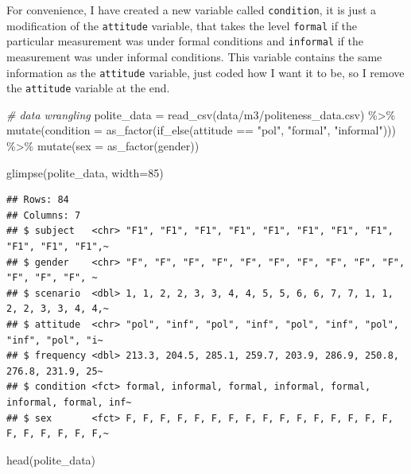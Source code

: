 \documentclass[
  openany]{book}
\newenvironment{Shaded}{\begin{snugshade}}{\end{snugshade}}
\newcommand{\AttributeTok}[1]{\textcolor[rgb]{0.77,0.63,0.00}{#1}}
\newcommand{\CommentTok}[1]{\textcolor[rgb]{0.56,0.35,0.01}{\textit{#1}}}
\newcommand{\DecValTok}[1]{\textcolor[rgb]{0.00,0.00,0.81}{#1}}
\newcommand{\FunctionTok}[1]{\textcolor[rgb]{0.00,0.00,0.00}{#1}}
\newcommand{\NormalTok}[1]{#1}
\newcommand{\OtherTok}[1]{\textcolor[rgb]{0.56,0.35,0.01}{#1}}
\newcommand{\SpecialCharTok}[1]{\textcolor[rgb]{0.00,0.00,0.00}{#1}}
\newcommand{\StringTok}[1]{\textcolor[rgb]{0.31,0.60,0.02}{#1}}
\begin{document}
For convenience, I have created a new variable called \texttt{condition}, it is just a modification of the \texttt{attitude} variable, that takes the level \texttt{formal} if the particular measurement was under formal conditions and \texttt{informal} if the measurement was under informal conditions. This variable contains the same information as the \texttt{attitude} variable, just coded how I want it to be, so I remove the \texttt{attitude} variable at the end.

\begin{Shaded}
\begin{Highlighting}[]
\CommentTok{\# data wrangling}
\NormalTok{polite\_data }\OtherTok{=} \FunctionTok{read\_csv}\NormalTok{(}\StringTok{\textquotesingle{}data/m3/politeness\_data.csv\textquotesingle{}}\NormalTok{) }\SpecialCharTok{\%\textgreater{}\%} 
  \FunctionTok{mutate}\NormalTok{(}\AttributeTok{condition =} \FunctionTok{as\_factor}\NormalTok{(}\FunctionTok{if\_else}\NormalTok{(attitude }\SpecialCharTok{==} \StringTok{"pol"}\NormalTok{, }\StringTok{"formal"}\NormalTok{, }\StringTok{"informal"}\NormalTok{))) }\SpecialCharTok{\%\textgreater{}\%} 
  \FunctionTok{mutate}\NormalTok{(}\AttributeTok{sex =} \FunctionTok{as\_factor}\NormalTok{(gender)) }
\end{Highlighting}
\end{Shaded}

\begin{Shaded}
\begin{Highlighting}[]
\FunctionTok{glimpse}\NormalTok{(polite\_data, }\AttributeTok{width=}\DecValTok{85}\NormalTok{)}
\end{Highlighting}
\end{Shaded}

\begin{verbatim}
## Rows: 84
## Columns: 7
## $ subject   <chr> "F1", "F1", "F1", "F1", "F1", "F1", "F1", "F1", "F1", "F1", "F1",~
## $ gender    <chr> "F", "F", "F", "F", "F", "F", "F", "F", "F", "F", "F", "F", "F", ~
## $ scenario  <dbl> 1, 1, 2, 2, 3, 3, 4, 4, 5, 5, 6, 6, 7, 7, 1, 1, 2, 2, 3, 3, 4, 4,~
## $ attitude  <chr> "pol", "inf", "pol", "inf", "pol", "inf", "pol", "inf", "pol", "i~
## $ frequency <dbl> 213.3, 204.5, 285.1, 259.7, 203.9, 286.9, 250.8, 276.8, 231.9, 25~
## $ condition <fct> formal, informal, formal, informal, formal, informal, formal, inf~
## $ sex       <fct> F, F, F, F, F, F, F, F, F, F, F, F, F, F, F, F, F, F, F, F, F, F,~
\end{verbatim}

\begin{Shaded}
\begin{Highlighting}[]
\FunctionTok{head}\NormalTok{(polite\_data)}
\end{Highlighting}
\end{Shaded}
\end{document}
